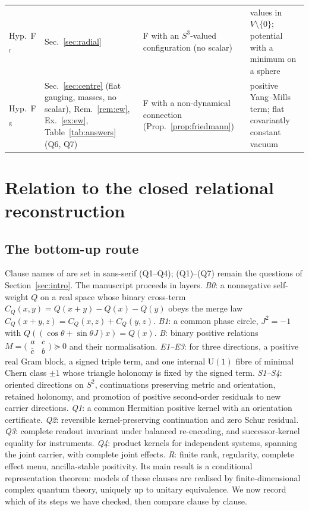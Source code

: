 \documentclass[aps,pra,onecolumn,superscriptaddress,nofootinbib,10pt]{revtex4-2}
\theoremstyle{definition}
\theoremstyle{remark}
\newcommand{\U}{\mathrm{U}}
\begin{document}
\begin{table}[h]
\begin{tabular}{@{}p{}p{}p{}p{}@{}}
Hyp.\ F$_{\mathrm r}$ & Sec.~\ref{sec:radial} & F with an $S^3$-valued configuration (no scalar) & values in $V\setminus\{0\}$; potential with a minimum on a sphere\\
Hyp.\ F$_{\mathrm g}$ & Sec.~\ref{sec:centre} (flat gauging, masses, no scalar), Rem.~\ref{rem:ew}, Ex.~\ref{ex:ew}, Table~\ref{tab:answers} (Q6, Q7) & F with a non-dynamical connection (Prop.~\ref{prop:friedmann}) & positive Yang--Mills term; flat covariantly constant vacuum\\
\bottomrule
\end{tabular}
\end{table}

\section{Relation to the closed relational reconstruction}\label{sec:crqo}

\subsection{The bottom-up route}
Clause names of \cite{CRQO} are set in sans-serif (\textsf{Q1}--\textsf{Q4}); (Q1)--(Q7) remain the questions of
Section~\ref{sec:intro}.  The manuscript \cite{CRQO} proceeds in layers.  \emph{B0}: a nonnegative self-weight $Q$ on a real
space whose binary cross-term $C_Q(x,y)=Q(x+y)-Q(x)-Q(y)$ obeys the merge law
$C_Q(x+y,z)=C_Q(x,z)+C_Q(y,z)$.  \emph{B1}: a common phase circle, $J^2=-1$ with
$Q((\cos\theta+\sin\theta J)x)=Q(x)$.  \emph{B}: binary positive relations
$M=\bigl(\begin{smallmatrix}a&c\\\bar c&b\end{smallmatrix}\bigr)\succeq0$ and their normalisation.
\emph{E1--E3}: for three directions, a positive real Gram block, a signed triple term, and one internal
$\U(1)$ fibre of minimal Chern class $\pm1$ whose triangle holonomy is fixed by the signed term.
\emph{S1--S4}: oriented directions on $S^2$, continuations preserving metric and orientation, retained
holonomy, and promotion of positive second-order residuals to new carrier directions.  \emph{\textsf{Q1}}: a
common Hermitian positive kernel with an orientation certificate.  \emph{\textsf{Q2}}: reversible
kernel-preserving continuation and zero Schur residual.  \emph{\textsf{Q3}}: complete readout invariant under
balanced re-encoding, and successor-kernel equality for instruments.  \emph{\textsf{Q4}}: product kernels for
independent systems, spanning the joint carrier, with complete joint effects.  \emph{R}: finite rank,
regularity, complete effect menu, ancilla-stable positivity.  Its main result is a conditional
representation theorem: models of these clauses are realised by finite-dimensional complex quantum
theory, uniquely up to unitary equivalence.  We now record which of its steps we have checked, then
compare clause by clause.
\end{document}
